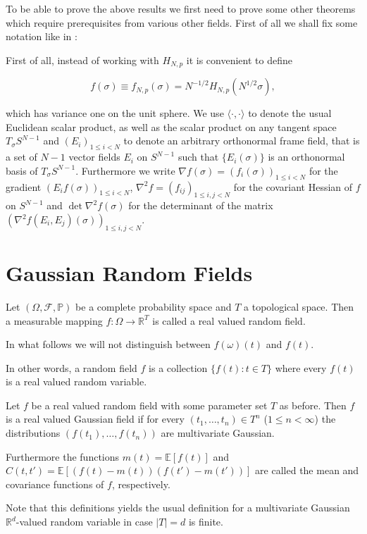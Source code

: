 To be able to prove the above results we first need to prove some other theorems which require prerequisites from various other fields. First of all we shall fix some notation like in \cite{Cerny10}:

First of all, instead of working with $H_{N,p}$ it is convenient to define

\begin{equation}\label{def:rescaledHamiltonian}
	f(\sigma)\equiv f_{N,p}(\sigma)=N^{-1/2}H_{N,p}(N^{1/2}\sigma),
\end{equation}


which has variance one on the unit sphere. We use $\langle\cdot,\cdot\rangle$ to denote the usual Euclidean scalar product, as well as the scalar product on any tangent space $T_\sigma S^{N-1}$ and $(E_i)_{1\leq i<N}$ to denote an arbitrary orthonormal frame field, that is a set of $N-1$ vector fields $E_i$ on $S^{N-1}$ such that $\{E_i(\sigma)\}$ is an orthonormal basis of $T_\sigma S^{N-1}$. Furthermore we write $\nabla f(\sigma)=(f_i(\sigma))_{1\leq i<N}$ for the gradient $(E_i f(\sigma))_{1\leq i<N}$, $\nabla^2 f = (f_{ij})_{1\leq i,j<N}$ for the covariant Hessian of $f$ on $S^{N-1}$ and $\det\nabla^2 f(\sigma)$ for the determinant of the matrix $(\nabla^2 f(E_i,E_j)(\sigma))_{1\leq i,j<N}$.

\section{Gaussian Random Fields}
\begin{definition}
	Let $(\Omega,\mathcal F, \mathbb P)$ be a complete probability space and $T$ a topological space. Then a measurable mapping $f:\Omega\rightarrow\mathbb R^T$ is called a real valued random field.
	
	In what follows we will not distinguish between $f(\omega)(t)$ and $f(t)$.
\end{definition}
In other words, a random field $f$ is a collection $\{f(t):t\in T\}$ where every $f(t)$ is a real valued random variable.

\begin{definition}
	Let $f$ be a real valued random field with some parameter set $T$ as before. Then $f$ is a real valued Gaussian field if for every $(t_1,\dots,t_n)\in T^n$ ($1\leq n <\infty$) the distributions $(f(t_1),\dots,f(t_n))$ are multivariate Gaussian.
	
	Furthermore the functions $m(t)=\mathbb E[f(t)]$ and $C(t,t')=\mathbb E[(f(t)-m(t))(f(t')-m(t'))]$ are called the mean and covariance functions of $f$, respectively.
\end{definition}
Note that this definitions yields the usual definition for a multivariate Gaussian $\mathbb R^d$-valued random variable in case $|T|=d$ is finite.


